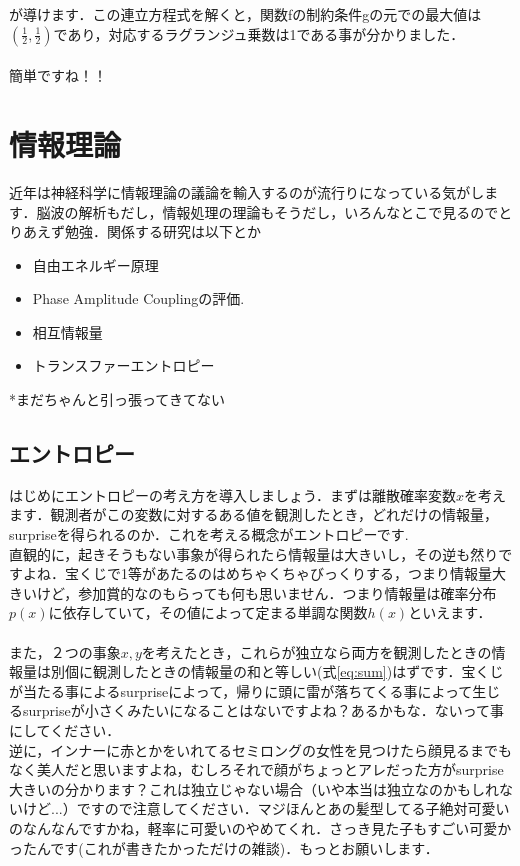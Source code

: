 \documentclass[11pt,a4paper,uplatex]{ujreport}
\begin{document}
が導けます．この連立方程式を解くと，関数fの制約条件gの元での最大値は$(\frac{1}{2}, \frac{1}{2})$であり，対応するラグランジュ乗数は1である事が分かりました．\\
\\

簡単ですね！！

\chapter{情報理論}
近年は神経科学に情報理論の議論を輸入するのが流行りになっている気がします．脳波の解析もだし，情報処理の理論もそうだし，いろんなとこで見るのでとりあえず勉強．関係する研究は以下とか\\
\begin{itemize}
 \item{自由エネルギー原理\cite{fep}}
 \item{Phase Amplitude Couplingの評価. \cite{tort}}
 \item{相互情報量}
 \item{トランスファーエントロピー}
\end{itemize}
*まだちゃんと引っ張ってきてない
\section{エントロピー}
はじめにエントロピーの考え方を導入しましょう．まずは離散確率変数$x$を考えます．観測者がこの変数に対するある値を観測したとき，どれだけの情報量，surpriseを得られるのか．これを考える概念がエントロピーです.\\

直観的に，起きそうもない事象が得られたら情報量は大きいし，その逆も然りですよね．宝くじで1等があたるのはめちゃくちゃびっくりする，つまり情報量大きいけど，参加賞的なのもらっても何も思いません．つまり情報量は確率分布$p(x)$に依存していて，その値によって定まる単調な関数$h(x)$といえます．\\
\\

また，２つの事象$x, y$を考えたとき，これらが独立なら両方を観測したときの情報量は別個に観測したときの情報量の和と等しい(式\ref{eq:sum})はずです．宝くじが当たる事によるsurpriseによって，帰りに頭に雷が落ちてくる事によって生じるsurpriseが小さくみたいになることはないですよね？あるかもな．ないって事にしてください．\\

逆に，インナーに赤とかをいれてるセミロングの女性を見つけたら顔見るまでもなく美人だと思いますよね，むしろそれで顔がちょっとアレだった方がsurprise大きいの分かります？これは独立じゃない場合（いや本当は独立なのかもしれないけど...）ですので注意してください．マジほんとあの髪型してる子絶対可愛いのなんなんですかね，軽率に可愛いのやめてくれ．さっき見た子もすごい可愛かったんです(これが書きたかっただけの雑談)．もっとお願いします．
\end{document}
